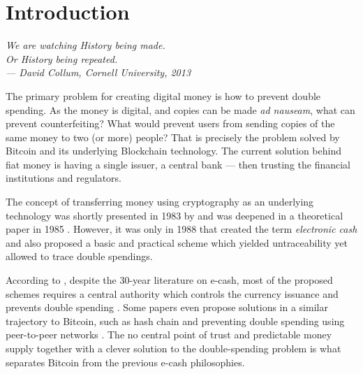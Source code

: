 




\section{Introduction}


\bigskip

\begin{flushright}{\slshape
    {We are watching History being made.\\
    Or History being repeated.}
	\\ \medskip
    --- David Collum, Cornell University, 2013}
\end{flushright}
\bigskip
\bigskip

The primary problem for creating digital money is how to prevent double spending. As the money is digital, and copies can be made \textit{ad nauseam}, what can prevent counterfeiting? What would prevent users from sending copies of the same money to two (or more) people? That is precisely the problem solved by Bitcoin and its underlying Blockchain technology. The current solution behind fiat money is having a single issuer, a central bank --- then trusting the financial institutions and regulators.

The concept of transferring money using cryptography as an underlying technology was shortly presented in 1983 by \citet{chaum1983blind} and was deepened in a theoretical paper in 1985 \citep{chaum1985security}. However, it was only in 1988 that \citet{chaum1988untraceable} created the term \emph{electronic cash} and also proposed a basic and practical scheme which yielded untraceability yet allowed to trace double spendings.

According to \citet{barber2012bitter}, despite the 30-year literature on e-cash, most of the proposed schemes requires a central authority which controls the currency issuance and prevents double spending \citep{chaum1983blind, okamoto1995efficient, camenisch2005compact, canard2007divisible}. Some papers even propose solutions in a similar trajectory to Bitcoin, such as hash chain \citep{zongkai2004new} and preventing double spending using peer-to-peer networks \citep{osipkov2007combating, hoepman2007distributed}. The no central point of trust and predictable money supply together with a clever solution to the double-spending problem is what separates Bitcoin from the previous e-cash philosophies.

